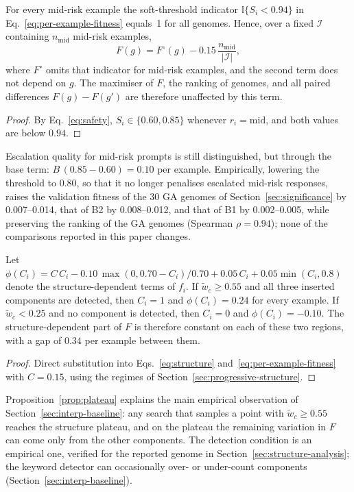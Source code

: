 \documentclass[mathematics,article,submit,xetex,moreauthors]{Definitions/mdpi}
\begin{document}
\begin{Proposition}\label{prop:offset}
For every mid-risk example the soft-threshold indicator
$\mathbb{I}\{S_i<0.94\}$ in Eq.~\eqref{eq:per-example-fitness} equals~1 for
all genomes. Hence, over a fixed $\mathcal{I}$ containing $n_{\mathrm{mid}}$
mid-risk examples,
\[
  F(g) = F^{\circ}(g) - 0.15\,\frac{n_{\mathrm{mid}}}{|\mathcal{I}|},
\]
where $F^{\circ}$ omits that indicator for mid-risk examples, and the second
term does not depend on $g$. The maximiser of $F$, the ranking of genomes, and
all paired differences $F(g)-F(g')$ are therefore unaffected by this term.
\end{Proposition}
\begin{proof}
By Eq.~\eqref{eq:safety}, $S_i\in\{0.60,0.85\}$ whenever $r_i=\mathrm{mid}$,
and both values are below $0.94$.
\end{proof}
\noindent Escalation quality for mid-risk prompts is still distinguished, but
through the base term: $B\,(0.85-0.60)=0.10$ per example.
Empirically, lowering the threshold to 0.80, so that it no longer penalises
escalated mid-risk responses, raises the validation fitness of the 30 GA genomes
of Section~\ref{sec:significance} by 0.007--0.014, that of B2 by 0.008--0.012, and
that of B1 by 0.002--0.005, while preserving the ranking of the GA genomes
(Spearman $\rho=0.94$); none of the comparisons reported in this paper changes.

\begin{Proposition}\label{prop:plateau}
Let $\phi(C_i)=C\,C_i-0.10\,\max(0,0.70-C_i)/0.70+0.05\,C_i+0.05\min(C_i,0.8)$
denote the structure-dependent terms of $f_i$. If $\tilde w_c\ge0.55$ and all
three inserted components are detected, then $C_i=1$ and
$\phi(C_i)=0.24$ for every example. If $\tilde w_c<0.25$ and no component is
detected, then $C_i=0$ and $\phi(C_i)=-0.10$. The structure-dependent part of
$F$ is therefore constant on each of these two regions, with a gap of $0.34$
per example between them.
\end{Proposition}
\begin{proof}
Direct substitution into Eqs.~\eqref{eq:structure}
and~\eqref{eq:per-example-fitness} with $C=0.15$, using the regimes of
Section~\ref{sec:progressive-structure}.
\end{proof}
\noindent Proposition~\ref{prop:plateau} explains the main empirical
observation of Section~\ref{sec:interp-baseline}: any search that samples a
point with $\tilde w_c\ge0.55$ reaches the structure plateau, and on the
plateau the remaining variation in $F$ can come only from the other
components. The detection condition is an empirical one, verified for the
reported genome in Section~\ref{sec:structure-analysis}; the keyword detector
can occasionally over- or under-count components
(Section~\ref{sec:interp-baseline}).
\end{document}
